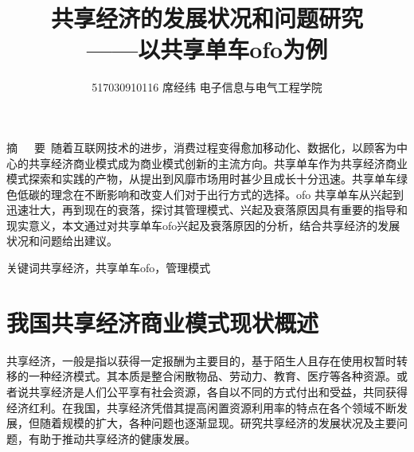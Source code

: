 \documentclass[a4paper,oneside,12pt]{article}
\title{\huge{共享经济的发展状况和问题研究\\——以共享单车ofo为例}}
\author{517030910116  \quad 席经纬 \quad   电子信息与电气工程学院}
\date{}  %
\begin{document}
\maketitle
\setlength{\oddsidemargin}{0.5cm}
\setlength{\evensidemargin}{\oddsidemargin}
\setlength{\textwidth}{15cm}
\vspace{-.8cm}
\begin{center}
\parbox{\textwidth}{
摘~~~要\quad {}~随着互联网技术的进步，消费过程变得愈加移动化、数据化，以顾客为中心的共享经济商业模式成为商业模式创新的主流方向。共享单车作为共享经济商业模式探索和实践的产物，从提出到风靡市场用时甚少且成长十分迅速。共享单车绿色低碳的理念在不断影响和改变人们对于出行方式的选择。ofo 共享单车从兴起到迅速壮大，再到现在的衰落，探讨其管理模式、兴起及衰落原因具有重要的指导和现实意义，本文通过对共享单车ofo兴起及衰落原因的分析，结合共享经济的发展状况和问题给出建议。

关键词\quad{}共享经济，共享单车ofo，管理模式\\}
\end{center}
\iffalse %
\vspace{-0.5cm}
\begin{center}
\parbox{\textwidth}{
\begin{center}
\large{\textbf{Research on Development and Difficulties of Shared Economy\\——Take the example of the shared bike ofo}}
\end{center}
\vspace{-0.5cm}
\begin{center}
\textbf{Xi Jingwei}\\[2pt]
\end{center}
{\small{\textbf{Abstract}\quad 
With the 

\textbf{Key Words}\quad microbe,  artificial intelligence, computer vision,  neural network}}
}
\end{center}
\fi %
\setlength{\oddsidemargin}{-.5cm}  %
\setlength{\evensidemargin}{\oddsidemargin}
\setlength{\textwidth}{17.00cm}

\section{我国共享经济商业模式现状概述}
共享经济，一般是指以获得一定报酬为主要目的，基于陌生人且存在使用权暂时转移的一种经济模式。其本质是整合闲散物品、劳动力、教育、医疗等各种资源。或者说共享经济是人们公平享有社会资源，各自以不同的方式付出和受益，共同获得经济红利。在我国，共享经济凭借其提高闲置资源利用率的特点在各个领域不断发展，但随着规模的扩大，各种问题也逐渐显现。研究共享经济的发展状况及主要问题，有助于推动共享经济的健康发展。
\end{document}
